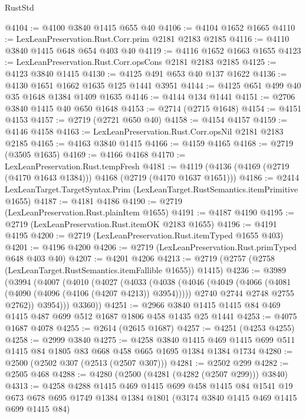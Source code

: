\begin{lexlean}{RustStd}
\begin{coremodule}
@4104 := @4100 @3840 @1415 @655 @40
@4106 := @4104 @1652 @1665
@4110 := LexLeanPreservation.Rust.Corr.prim @2181 @2183 @2185
@4116 := @4110 @3840 @1415 @648 @654 @403 @40
@4119 := @4116 @1652 @1663 @1655
@4123 := LexLeanPreservation.Rust.Corr.opsCons @2181 @2183 @2185
@4125 := @4123 @3840 @1415
@4130 := @4125 @491 @653 @40 @137 @1622
@4136 := @4130 @1651 @1662 @1635 @125 @1441 @3951
@4144 := @4125 @651 @499 @40 @35 @1648 @1384 @1409 @1635
@4146 := @4144 @134 @1441
@4151 := @2706 @3840 @1415 @40 @650 @1648
@4153 := @2714 (@2715 @1648)
@4154 := @4151 @4153
@4157 := @2719 (@2721 @650 @40)
@4158 := @4154 @4157
@4159 := @4146 @4158
@4163 := LexLeanPreservation.Rust.Corr.opsNil @2181 @2183 @2185
@4165 := @4163 @3840 @1415
@4166 := @4159 @4165
@4168 := @2719 (@3505 @1635)
@4169 := @4166 @4168
@4170 := LexLeanPreservation.Rust.tempFresh
@4181 := @4119 (@4136 (@4169 (@2719 (@4170 @1643 @1384))) @4168 (@2719 (@4170 @1637 @1651)))
@4186 := @2414 LexLeanTarget.TargetSyntax.Prim (LexLeanTarget.RustSemantics.itemPrimitive @1655)
@4187 := @4181 @4186
@4190 := @2719 (LexLeanPreservation.Rust.plainItem @1655)
@4191 := @4187 @4190
@4195 := @2719 (LexLeanPreservation.Rust.itemOK @2183 @1655)
@4196 := @4191 @4195
@4200 := @2719 (LexLeanPreservation.Rust.itemTyped @1655 @403)
@4201 := @4196 @4200
@4206 := @2719 (LexLeanPreservation.Rust.primTyped @648 @403 @40)
@4207 := @4201 @4206
@4213 := @2719 (@2757 (@2758 (LexLeanTarget.RustSemantics.itemFallible @1655)) @1415)
@4236 := @3989
    (@3994
      (@4007
        (@4010
          (@4027
            (@4033
              (@4038
                (@4046
                  (@4049 (@4066 (@4081 (@4090 (@4096 (@4106 (@4207 @4213)) @3954)))))
                  @2740
                  @2744
                  @2748
                  @2755
                  @2762))
              @3954)))
        @3360))
@4251 := @2966 @3840 @1415 @1415 @84 @469 @1415 @487 @699 @512 @1687 @1806 @458 @1435 @25 @1441
@4253 := @4075 @1687 @4078
@4255 := @2614 (@2615 @1687)
@4257 := @4251 (@4253 @4255)
@4258 := @2999 @3840
@4275 := @4258
    @3840
    @1415
    @469
    @1415
    @699
    @511
    @1415
    @84
    @1805
    @83
    @668
    @458
    @665
    @1695
    @1384
    @1384
    @1734
@4280 := @2500 (@2502 @307 (@2513 (@2507 @307)))
@4281 := @2502 @299
@4282 := @2505 @468
@4288 := @4280 (@2500 (@4281 (@4282 (@2507 @299))) @3840)
@4313 := @4258
    @4288
    @1415
    @469
    @1415
    @699
    @458
    @1415
    @84
    @1541
    @19
    @673
    @678
    @695
    @1749
    @1384
    @1384
    @1801
    (@3174 @3840 @1415 @469 @1415 @699 @1415 @84)

\end{coremodule}
\end{lexlean}
